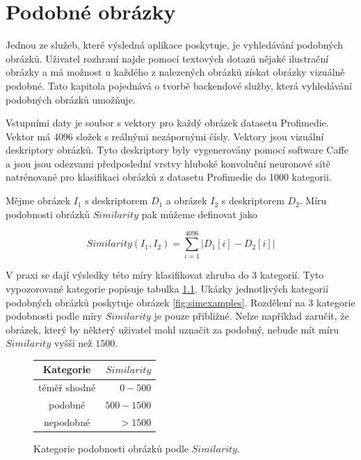 \chapter{Podobné obrázky}
\label{chap:similar}


Jednou ze služeb, které výsledná aplikace poskytuje, je vyhledávání podobných obrázků. Uživatel rozhraní najde pomocí textových dotazů nějaké ilustrační obrázky a má možnost u každého z nalezených obrázků získat obrázky vizuálně podobné. Tato kapitola pojednává o tvorbě backendové služby, která vyhledávání podobných obrázků umožňuje.

Vstupními daty je soubor s vektory pro každý obrázek datasetu Profimedie. Vektor má $4 096$ složek s reálnými nezápornými čísly. Vektory jsou vizuální deskriptory obrázků. Tyto deskriptory byly vygenerovány pomocí software Caffe\cite{caffe} a jsou jsou odezvami předposlední vrstvy hluboké konvoluční neuronové sítě natrénované pro klasifikaci obrázků z datasetu Profimedie do 1000 kategorii.

Mějme obrázek $I_1$ s deskriptorem $D_1$ a obrázek $I_2$ s deskriptorem $D_2$. Míru podobnosti obrázků $Similarity$ pak můžeme definovat jako

\begin{equation}
  Similarity(I_1, I_2) = \sum_{i=1}^{4096} |D_1[i]-D_2[i]|
\end{equation}

V praxi se dají výsledky této míry klasifikovat zhruba do 3 kategorií. Tyto vypozorované kategorie popisuje tabulka \ref{fig:simtypes}. Ukázky jednotlivých kategorií podobných obrázků poskytuje obrázek \ref{fig:simexamples}. Rozdělení na 3 kategorie podobnosti podle míry $Similarity$ je pouze přibližné. Nelze například zaručit, že obrázek, který by některý uživatel mohl uznačit za podobný, nebude mít míru $Similarity$ vyšší než $1 500$.

\begin{figure}[h]
\label{fig:simtypes}
\centering
\begin{tabular}{ | c | r |}
  \hline
     Kategorie & $Similarity$\\
  \hline
  \hline
    téměř shodné & $0 - 500$ \\
  \hline
    podobné & $500 - 1500$ \\
  \hline
    nepodobné & $> 1500$ \\
\hline
\end{tabular}

  \caption{Kategorie podobnosti obrázků podle $Similarity$.}
\end{figure}

